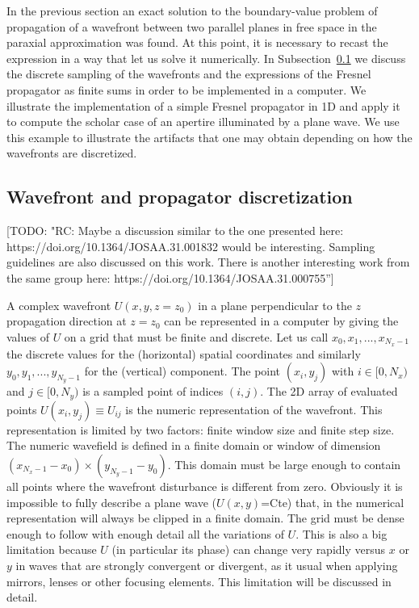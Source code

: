 \documentclass{iucr}              %
\newcommand{\todo}[1]{{\color{red}[TODO: "#1'']}}
\begin{document}
In the previous section an exact solution to the boundary-value problem of propagation of a wavefront between two parallel planes in free space in the paraxial approximation was found. At this point, it is necessary to recast the expression in a way that let us solve it numerically. In Subsection~\ref{subch: discretization} we discuss the discrete sampling of the wavefronts and the expressions of the Fresnel propagator as finite sums in order to be implemented in a computer. We illustrate the implementation of a simple Fresnel propagator in 1D and apply it to compute the scholar case of an apertire illuminated by a plane wave. We use this example to illustrate the artifacts that one may obtain depending on how the wavefronts are discretized.


\subsection{Wavefront and propagator discretization}
\label{subch: discretization}
\todo{RC: Maybe a discussion similar to the one presented here: https://doi.org/10.1364/JOSAA.31.001832 would be interesting. Sampling guidelines are also discussed on this work. There is another interesting work from the same group here: https://doi.org/10.1364/JOSAA.31.000755}

A complex wavefront $U(x,y,z=z_0)$ in a plane perpendicular to the $z$ propagation direction at $z=z_0$ can be represented in a computer by giving the values of $U$ on a grid that must be finite and discrete. Let us call ${x_0,x_1,...,x_{N_x-1}}$ the discrete values for the (horizontal) spatial coordinates and similarly  ${y_0,y_1,...,y_{N_y-1}}$ for the (vertical) component. The point $(x_i,y_j)$ with $i \in [0,N_x)$ and  $j \in [0,N_y)$ is a sampled point of indices $(i,j)$. The 2D array of evaluated points $U(x_i,y_j) \equiv U_{ij}$ is the numeric representation of the wavefront. This representation is limited by two factors: finite window size and finite step size. The numeric wavefield is defined in a finite domain or window of dimension $(x_{N_x-1}-x_0) \times (y_{N_y-1}-y_0)$. This domain must be large enough to contain all points where the wavefront disturbance is different from zero. Obviously it is impossible to fully describe a plane wave ($U(x,y)$=Cte) that, in the numerical representation will always be clipped in a finite domain. The grid must be dense enough to follow with enough detail all the variations of $U$. This is also a big limitation because $U$ (in particular its phase) can change very rapidly versus $x$ or $y$ in waves that are strongly convergent or divergent, as it usual when applying mirrors, lenses or other focusing elements. This limitation will be discussed in detail. 
\end{document}

